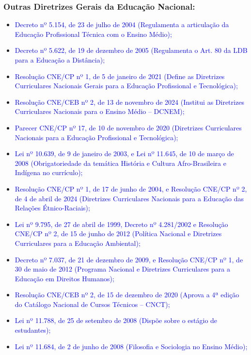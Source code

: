 \documentclass{../../modelos/latex-shared/ifsc-ppc}
\newcommand{\revisao}[1]{\textcolor{blue}{#1}}
\newcommand{\revisao}[1]{#1}
\newcommand{\semsumario}[1]{\addtocontents{toc}{\protect\setcounter{tocdepth}{2}}#1\addtocontents{toc}{\protect\setcounter{tocdepth}{4}}}
\begin{document}
\semsumario{\subsubsection{Outras Diretrizes Gerais da Educação Nacional:}}
\begin{itemize}
    \item \revisao{Decreto nº 5.154, de 23 de julho de 2004 (Regulamenta a articulação da Educação Profissional Técnica com o Ensino Médio);}
    \item \revisao{Decreto nº 5.622, de 19 de dezembro de 2005 (Regulamenta o Art. 80 da LDB para a Educação a Distância);}
    \item \revisao{Resolução CNE/CP nº 1, de 5 de janeiro de 2021 (Define as Diretrizes Curriculares Nacionais Gerais para a Educação Profissional e Tecnológica);}
    \item \revisao{Resolução CNE/CEB nº 2, de 13 de novembro de 2024 (Institui as Diretrizes Curriculares Nacionais para o Ensino Médio -- DCNEM);}
    \item \revisao{Parecer CNE/CP nº 17, de 10 de novembro de 2020 (Diretrizes Curriculares Nacionais para a Educação Profissional e Tecnológica);}
    \item \revisao{Lei nº 10.639, de 9 de janeiro de 2003, e Lei nº 11.645, de 10 de março de 2008 (Obrigatoriedade da temática História e Cultura Afro-Brasileira e Indígena no currículo);}
    \item \revisao{Resolução CNE/CP nº 1, de 17 de junho de 2004, e Resolução CNE/CP nº 2, de 4 de abril de 2024 (Diretrizes Curriculares Nacionais para a Educação das Relações Étnico-Raciais);}
    \item \revisao{Lei nº 9.795, de 27 de abril de 1999, Decreto nº 4.281/2002 e Resolução CNE/CP nº 2, de 15 de junho de 2012 (Política Nacional e Diretrizes Curriculares para a Educação Ambiental);}
    \item \revisao{Decreto nº 7.037, de 21 de dezembro de 2009, e Resolução CNE/CP nº 1, de 30 de maio de 2012 (Programa Nacional e Diretrizes Curriculares para a Educação em Direitos Humanos);}
    \item \revisao{Resolução CNE/CEB nº 2, de 15 de dezembro de 2020 (Aprova a 4ª edição do Catálogo Nacional de Cursos Técnicos -- CNCT);}
    \item \revisao{Lei nº 11.788, de 25 de setembro de 2008 (Dispõe sobre o estágio de estudantes);}
    \item \revisao{Lei nº 11.684, de 2 de junho de 2008 (Filosofia e Sociologia no Ensino Médio);}

\end{itemize}
\end{document}

